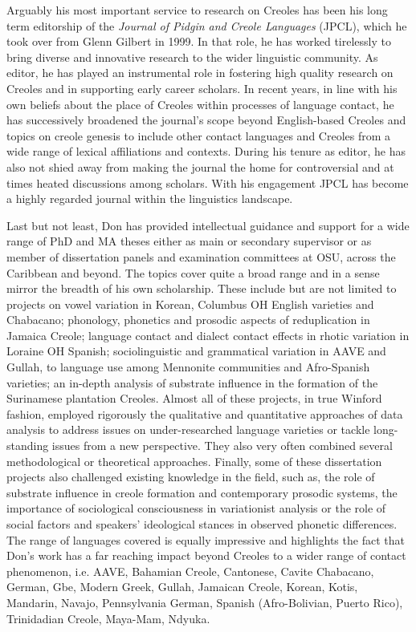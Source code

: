 \documentclass[output=paper, colorlinks,citecolor=brown]{langscibook}
\begin{document}
Arguably his most important service to research on Creoles has been his long term editorship of the \textit{Journal of Pidgin and Creole Languages} (JPCL), which he took over from Glenn Gilbert in 1999. In that role, he has worked tirelessly to bring diverse and innovative research to the wider linguistic community. As editor, he has played an instrumental role in fostering high quality research on Creoles and in supporting early career scholars. In recent years, in line with his own beliefs about the place of Creoles within processes of language contact, he has successively broadened the journal’s scope beyond English-based Creoles and topics on creole genesis to include other contact languages and Creoles from a wide range of lexical affiliations and contexts. During his tenure as editor, he has also not shied away from making  the journal the home for controversial and at times heated discussions among scholars. With his engagement JPCL has become a highly regarded journal within the linguistics landscape.  

Last but not least, Don has provided intellectual guidance and support for a wide range of PhD and MA theses either as main or secondary supervisor or as member of dissertation panels and examination committees at OSU, across the Caribbean and beyond. The topics cover quite a broad range and in a sense mirror the breadth of his own scholarship.  These include but are not limited to projects on vowel variation in Korean, Columbus OH English varieties and Chabacano; phonology, phonetics and prosodic aspects of reduplication in Jamaica Creole; language contact and dialect contact effects in rhotic variation in Loraine OH Spanish; sociolinguistic and grammatical variation in AAVE and Gullah, to language use among Mennonite communities and Afro-Spanish varieties; an in-depth analysis of substrate influence in the formation of the Surinamese plantation Creoles.  Almost all of these projects, in true Winford fashion, employed rigorously the qualitative and quantitative approaches of data analysis to address issues on under-researched language varieties or tackle long-standing issues from a new perspective. They also very often combined several methodological or theoretical approaches. Finally, some of these dissertation projects also challenged existing knowledge in the field, such as, the role of substrate influence in creole formation and contemporary prosodic systems, the importance of sociological consciousness in variationist analysis or the role of social factors and speakers' ideological stances in observed phonetic differences. The range of languages covered is equally impressive and highlights the fact that Don's work has a far reaching impact beyond Creoles to a wider range of contact phenomenon, i.e. AAVE, Bahamian Creole, Cantonese, Cavite Chabacano, German, Gbe, Modern Greek, Gullah, Jamaican Creole, Korean, Kotis, Mandarin, Navajo, Pennsylvania German, Spanish (Afro-Bolivian, Puerto Rico), Trinidadian Creole, Maya-Mam,  Ndyuka.
\end{document}
